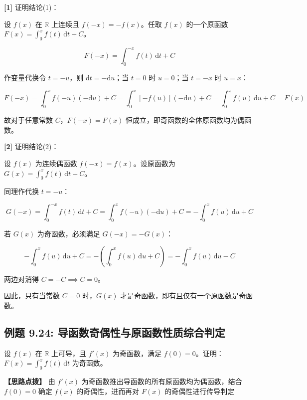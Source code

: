 \documentclass[11pt,a4paper,UTF8]{ctexart}
\begin{document}
\begin{solbox}[分步推导与答题规范]
\textbf{[1]} 证明结论(1)：

设 $f(x)$ 在 $\mathbb{R}$ 上连续且 $f(-x) = -f(x)$。任取 $f(x)$ 的一个原函数 $F(x) = \int_0^x f(t)\,\mathrm{d}t + C$。


\begin{equation*}
F(-x) = \int_0^{-x} f(t)\,\mathrm{d}t + C
\end{equation*}


作变量代换令 $t = -u$，则 $\mathrm{d}t = -\mathrm{d}u$；当 $t=0$ 时 $u=0$；当 $t=-x$ 时 $u=x$：


\begin{equation*}
F(-x) = \int_0^x f(-u)(-\mathrm{d}u) + C = \int_0^x [-f(u)](-\mathrm{d}u) + C = \int_0^x f(u)\,\mathrm{d}u + C = F(x)
\end{equation*}


故对于任意常数 $C$，$F(-x) = F(x)$ 恒成立，即奇函数的全体原函数均为偶函数。

\textbf{[2]} 证明结论(2)：

设 $f(x)$ 为连续偶函数 $f(-x) = f(x)$。设原函数为 $G(x) = \int_0^x f(t)\,\mathrm{d}t + C$。

同理作代换 $t = -u$：


\begin{equation*}
G(-x) = \int_0^{-x} f(t)\,\mathrm{d}t + C = \int_0^x f(-u)(-\mathrm{d}u) + C = -\int_0^x f(u)\,\mathrm{d}u + C
\end{equation*}


若 $G(x)$ 为奇函数，必须满足 $G(-x) = -G(x)$：


\begin{equation*}
-\int_0^x f(u)\,\mathrm{d}u + C = -\left(\int_0^x f(u)\,\mathrm{d}u + C\right) = -\int_0^x f(u)\,\mathrm{d}u - C
\end{equation*}


两边对消得 $C = -C \implies C = 0$。

因此，只有当常数 $C=0$ 时，$G(x)$ 才是奇函数，即有且仅有一个原函数是奇函数。
\end{solbox}


\subsection{例题 9.24: 导函数奇偶性与原函数性质综合判定}

设 $f(x)$ 在 $\mathbb{R}$ 上可导，且 $f'(x)$ 为奇函数，满足 $f(0)=0$。证明：$F(x) = \int_0^x f(t)\,\mathrm{d}t$ 为奇函数。

\textbf{\color{DeepPurple}【思路点拨】} 由 $f'(x)$ 为奇函数推出导函数的所有原函数均为偶函数，结合 $f(0)=0$ 确定 $f(x)$ 的奇偶性，进而再对 $F(x)$ 的奇偶性进行传导判定
\end{document}
